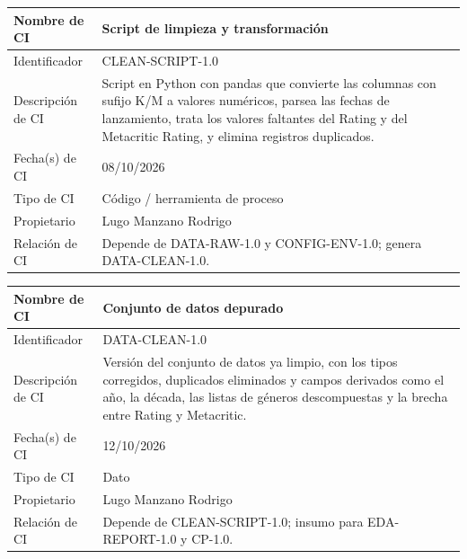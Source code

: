 \documentclass[letterpaper,11pt]{article}
\begin{document}
\noindent\begin{minipage}{\textwidth}
\small\renewcommand{\arraystretch}{1.9}
\begin{tabularx}{\textwidth}{|p{3.3cm}|Y|}
\hline
Nombre de CI & Script de limpieza y transformación \\ \hline
Identificador & CLEAN-SCRIPT-1.0 \\ \hline
Descripción de CI & Script en Python con pandas que convierte las columnas con sufijo K/M a valores numéricos, parsea las fechas de lanzamiento, trata los valores faltantes del Rating y del Metacritic Rating, y elimina registros duplicados. \\ \hline
Fecha(s) de CI & 08/10/2026 \\ \hline
Tipo de CI & Código / herramienta de proceso \\ \hline
Propietario & Lugo Manzano Rodrigo \\ \hline
Relación de CI & Depende de DATA-RAW-1.0 y CONFIG-ENV-1.0; genera DATA-CLEAN-1.0. \\ \hline
\end{tabularx}
\end{minipage}\par\bigskip
\noindent\begin{minipage}{\textwidth}
\small\renewcommand{\arraystretch}{1.9}
\begin{tabularx}{\textwidth}{|p{3.3cm}|Y|}
\hline
Nombre de CI & Conjunto de datos depurado \\ \hline
Identificador & DATA-CLEAN-1.0 \\ \hline
Descripción de CI & Versión del conjunto de datos ya limpio, con los tipos corregidos, duplicados eliminados y campos derivados como el año, la década, las listas de géneros descompuestas y la brecha entre Rating y Metacritic. \\ \hline
Fecha(s) de CI & 12/10/2026 \\ \hline
Tipo de CI & Dato \\ \hline
Propietario & Lugo Manzano Rodrigo \\ \hline
Relación de CI & Depende de CLEAN-SCRIPT-1.0; insumo para EDA-REPORT-1.0 y CP-1.0. \\ \hline
\end{tabularx}
\end{minipage}\par\bigskip
\end{document}
